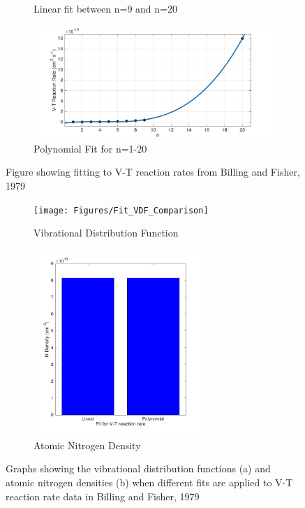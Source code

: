 \documentclass[11pt, oneside]{article}   	%
\begin{document}
\begin{figure}
\begin{subfigure}{0.5\textwidth}
\caption{Linear fit between n=9 and n=20}
\end{subfigure}
\begin{subfigure}{0.5\textwidth}
\includegraphics[width=\textwidth]{Figures/Polynomial}
\caption{Polynomial Fit for n=1-20}
\end{subfigure}
\caption{Figure showing fitting to V-T reaction rates from Billing and Fisher, 1979 \cite{Billing1979vv}}
\label{fig:fits}
\end{figure}

\begin{figure}
\begin{subfigure}{0.5\textwidth}
\texttt{[image: Figures/Fit\_VDF\_Comparison]}
\caption{Vibrational Distribution Function}
\label{subfig:VDF}
\end{subfigure}
\begin{subfigure}{0.5\textwidth}
\begin{center}
\includegraphics[width=0.7\textwidth]{Figures/Ndensity}
\caption{Atomic Nitrogen Density}
\end{center}
\end{subfigure}
\caption{Graphs showing the vibrational distribution functions (a) and atomic nitrogen densities (b) when different fits are applied to V-T reaction rate data in Billing and Fisher, 1979 \cite{Billing1979vv}}
\label{fig:VDFandN}
\end{figure}
\end{document}
